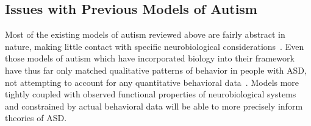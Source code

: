 \subsection{Issues with Previous Models of Autism}
Most of the existing models of autism reviewed above are fairly abstract in nature, making little contact with specific neurobiological considerations~\cite{CohenIL:1994:AutismLearning,McClellandJL:2000:Autism,OLoughlinC:2000:Coherence}.  Even those models of autism which have incorporated biology into their framework have thus far only matched qualitative patterns of behavior in people with ASD, not attempting to account for any quantitative behavioral data~\cite{GustafssonL:1997:AutismMaps,RefWorks:146}.  Models more tightly coupled with observed functional properties of neurobiological systems and constrained by actual behavioral data will be able to more precisely inform theories of ASD. 
